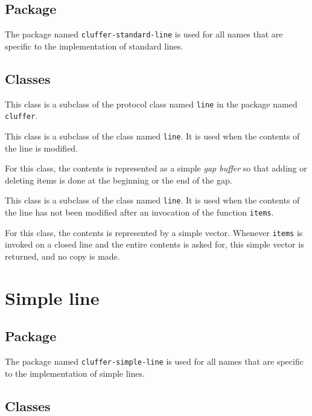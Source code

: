 \subsection{Package}

The package named \texttt{cluffer-standard-line} is used for all names
that are specific to the implementation of standard lines.

\subsection{Classes}


This class is a subclass of the protocol class named \texttt{line} in
the package named \texttt{cluffer}.


This class is a subclass of the class named \texttt{line}.  It is used
when the contents of the line is modified.

For this class, the contents is represented as a simple \emph{gap
  buffer} so that adding or deleting items is done at the beginning or
the end of the gap.


This class is a subclass of the class named \texttt{line}.  It is used
when the contents of the line has not been modified after an
invocation of the function \texttt{items}.

For this class, the contents is represented by a simple \commonlisp{}
vector.  Whenever \texttt{items} is invoked on a closed line and the
entire contents is asked for, this simple vector is returned, and no
copy is made.

\section{Simple line}

\subsection{Package}

The package named \texttt{cluffer-simple-line} is used for all names
that are specific to the implementation of simple lines.

\subsection{Classes}

